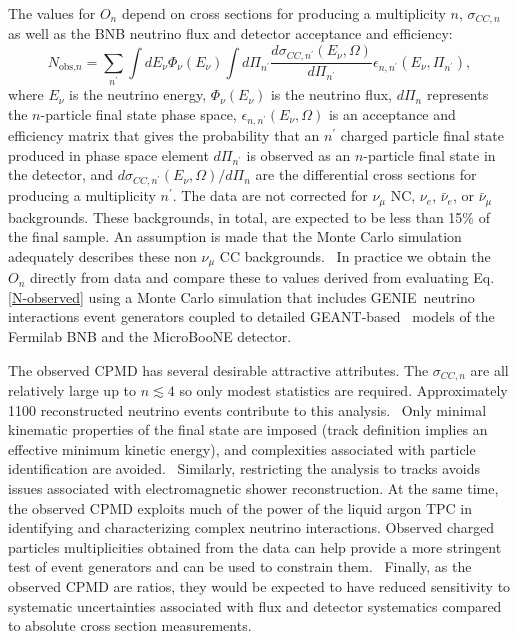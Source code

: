 \documentclass{article}
\begin{document}
The values for $O_{n}$ depend on cross sections for producing a multiplicity 
$n$, $\sigma _{CC,n}$ as well as the BNB neutrino flux and detector
acceptance and efficiency:%
\begin{equation}
N_{\text{obs,}n}=\sum_{n^{\prime
}}\int dE_{\nu }\Phi _{\nu }\left( E_{\nu }\right) \int d\Pi _{n^{\prime }}%
\frac{d\sigma _{CC,n^{\prime }}\left( E_{\nu },\Omega \right) }{d\Pi
_{n^{\prime }}}\epsilon _{n,n^{\prime }}\left( E_{\nu },\Pi _{n^{\prime
}}\right) ,  \label{N-observed}
\end{equation}%
where $E_{\nu }$ is the neutrino energy, $\Phi _{\nu }\left( E_{\nu }\right) 
$ is the neutrino flux, $d\Pi _{n}$ represents the $n$-particle final state phase space, $%
\epsilon _{n,n^{\prime }}\left( E_{\nu },\Omega \right) $ is an acceptance
and efficiency matrix that gives the probability that an $n^{\prime }$ charged
particle final state produced in phase space element $d\Pi _{n^{\prime }}$
is observed as an $n$-particle final state in the detector, and $d\sigma
_{CC,n^{\prime }}\left( E_{\nu },\Omega \right) /d\Pi _{n}$ are the
differential cross sections for producing a multiplicity $n^{\prime }$. The data are not corrected for $\nu_\mu$ NC, $\nu_{e}$, $\bar\nu_e$, or $\bar{\nu}_\mu$ backgrounds. These backgrounds, in total, are expected to be less than 15\% of the final sample. An assumption is made that the Monte Carlo simulation adequately describes these non $\nu_\mu$ CC backgrounds. \ In
practice we obtain the $O_{n}$ directly from data and compare these to
values derived from evaluating Eq. \ref{N-observed} using a Monte Carlo
simulation that includes GENIE\ neutrino interactions event generators
coupled to detailed GEANT-based~\cite{Geant4 reference} models of the
Fermilab BNB and the MicroBooNE detector.

The observed CPMD has several desirable attractive attributes. The $\sigma
_{CC,n}$ are all relatively large up to $n\lesssim 4$ so only modest
statistics are required. Approximately 1100 reconstructed  neutrino events contribute to this analysis. \ Only minimal kinematic properties of the final
state are imposed (track definition implies an effective minimum kinetic
energy), and complexities associated with particle identification are
avoided. \ Similarly, restricting the analysis to tracks avoids
issues associated with electromagnetic shower reconstruction. At the same time, the observed
CPMD exploits much of the power of the liquid argon TPC in identifying and
characterizing complex neutrino interactions. Observed charged particles multiplicities obtained from the data can help provide a more stringent test of event generators and can be used to constrain them. \ Finally, as the observed
CPMD are ratios, they would be expected to have reduced sensitivity to
systematic uncertainties associated with flux and detector systematics compared to
absolute cross section measurements.
\end{document}
